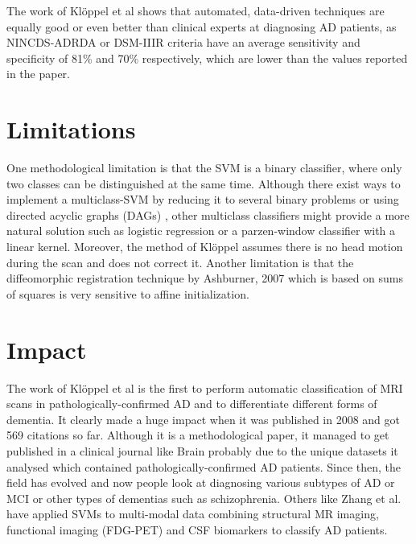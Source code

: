 \documentclass[11pt,a4paper,oneside]{report}
\begin{document}
The work of Kl\"{o}ppel et al shows that automated, data-driven techniques are equally good or even better than clinical experts at diagnosing AD patients, as NINCDS-ADRDA or DSM-IIIR criteria have an average sensitivity and specificity of 81\% and 70\% respectively, which are lower than the values reported in the paper. \cite{knopman2001practice} 

\section*{Limitations}

One methodological limitation is that the SVM is a binary classifier, where only two classes can be distinguished at the same time. Although there exist ways to implement a multiclass-SVM by reducing it to several binary problems \cite{duan2005best} or using directed acyclic graphs (DAGs) \cite{platt1999large}, other multiclass classifiers might provide a more natural solution such as logistic regression \cite{desikan2009automated} or a parzen-window classifier with a linear kernel. \cite{shawe2004kernel} Moreover, the method of Kl\"{o}ppel assumes there is no head motion during the scan and does not correct it. Another limitation is that the diffeomorphic registration technique by Ashburner, 2007 \cite{ashburner2007fast} which is based on sums of squares is very sensitive to affine initialization. \cite{avants2011reproducible}


\section*{Impact}

The work of Kl\"{o}ppel et al is the first to perform automatic classification of MRI scans in pathologically-confirmed AD and to differentiate different forms of dementia. It clearly made a huge impact when it was published in 2008 and got 569 citations so far. Although it is a methodological paper, it managed to get published in a clinical journal like Brain probably due to the unique datasets it analysed which contained pathologically-confirmed AD patients. Since then, the field has evolved and now people look at diagnosing various subtypes of AD or MCI \cite{haller2013individual} or other types of dementias such as schizophrenia. \cite{ardekani2011diffusion} Others like Zhang et al. have applied SVMs to multi-modal data combining structural MR imaging, functional imaging (FDG-PET) and CSF biomarkers to classify AD patients. \cite{zhang2011multimodal}
\end{document}

